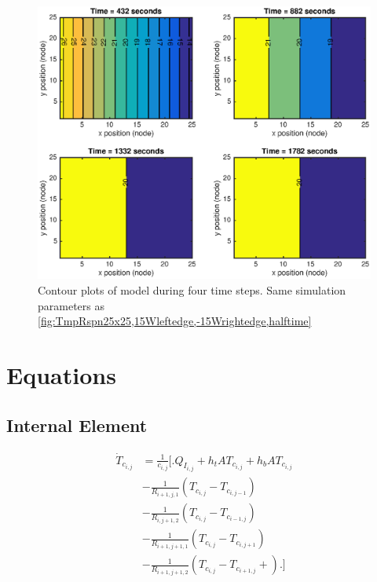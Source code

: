 \documentclass[10pt,twocolumn]{article}
\begin{document}
\begin{figure}
	\center
	\includegraphics[width=0.8\linewidth]{CtrTnst25x25,15Wleftedge,-15Wrightedge,halftime.eps}
	\caption{Contour plots of model during four time steps. Same simulation parameters as \autoref{fig:TmpRspn25x25,15Wleftedge,-15Wrightedge,halftime}}
	\label{fig:CtrTnst25x25,15Wleftedge,-15Wrightedge,halftime}
\end{figure}

\twocolumn
\section{Equations}
\subsection{Internal Element}
\begin{equation}
\begin{split}
\dot{T}_{c_{i,j}} 	& = \frac{1}{c_{i,j}}
					\Biggl[\Biggr.
					 	Q_{I_{i,j}} + h_{t}AT_{c_{i,j}} + h_{b}AT_{c_{i,j}} \\					
					&	- \frac{1}{R_{i+1,j,1}}\left(T_{c_{i,j}}- T_{c_{i,j-1}}\right) \\
					& 	- \frac{1}{R_{i,j+1,2}}\left(T_{c_{i,j}}- T_{c_{i-1,j}}\right) \\
					& 	- \frac{1}{R_{i+1,j+1,1}}\left(T_{c_{i,j}}- T_{c_{i,j+1}}\right) \\
					& 	- \frac{1}{R_{i+1,j+1,2}}\left(T_{c_{i,j}}- T_{c_{i+1,j}} + \right)
					\Biggl.\Biggl]
\end{split}
\end{equation}
\end{document}
